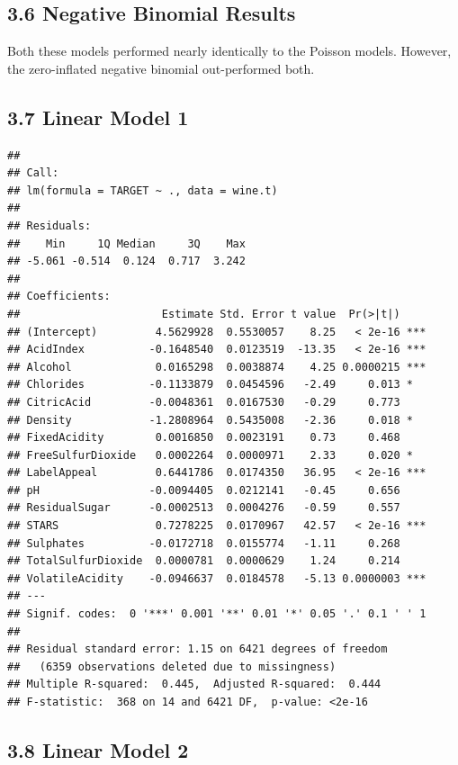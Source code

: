 \documentclass[]{article}
\begin{document}
\hypertarget{negative-binomial-results}{%
\subsection{3.6 Negative Binomial
Results}\label{negative-binomial-results}}

Both these models performed nearly identically to the Poisson models.
However, the zero-inflated negative binomial out-performed both.

\hypertarget{linear-model-1}{%
\subsection{3.7 Linear Model 1}\label{linear-model-1}}

\begin{verbatim}
## 
## Call:
## lm(formula = TARGET ~ ., data = wine.t)
## 
## Residuals:
##    Min     1Q Median     3Q    Max 
## -5.061 -0.514  0.124  0.717  3.242 
## 
## Coefficients:
##                      Estimate Std. Error t value  Pr(>|t|)    
## (Intercept)         4.5629928  0.5530057    8.25   < 2e-16 ***
## AcidIndex          -0.1648540  0.0123519  -13.35   < 2e-16 ***
## Alcohol             0.0165298  0.0038874    4.25 0.0000215 ***
## Chlorides          -0.1133879  0.0454596   -2.49     0.013 *  
## CitricAcid         -0.0048361  0.0167530   -0.29     0.773    
## Density            -1.2808964  0.5435008   -2.36     0.018 *  
## FixedAcidity        0.0016850  0.0023191    0.73     0.468    
## FreeSulfurDioxide   0.0002264  0.0000971    2.33     0.020 *  
## LabelAppeal         0.6441786  0.0174350   36.95   < 2e-16 ***
## pH                 -0.0094405  0.0212141   -0.45     0.656    
## ResidualSugar      -0.0002513  0.0004276   -0.59     0.557    
## STARS               0.7278225  0.0170967   42.57   < 2e-16 ***
## Sulphates          -0.0172718  0.0155774   -1.11     0.268    
## TotalSulfurDioxide  0.0000781  0.0000629    1.24     0.214    
## VolatileAcidity    -0.0946637  0.0184578   -5.13 0.0000003 ***
## ---
## Signif. codes:  0 '***' 0.001 '**' 0.01 '*' 0.05 '.' 0.1 ' ' 1
## 
## Residual standard error: 1.15 on 6421 degrees of freedom
##   (6359 observations deleted due to missingness)
## Multiple R-squared:  0.445,  Adjusted R-squared:  0.444 
## F-statistic:  368 on 14 and 6421 DF,  p-value: <2e-16
\end{verbatim}

\hypertarget{linear-model-2}{%
\subsection{3.8 Linear Model 2}\label{linear-model-2}}
\end{document}
